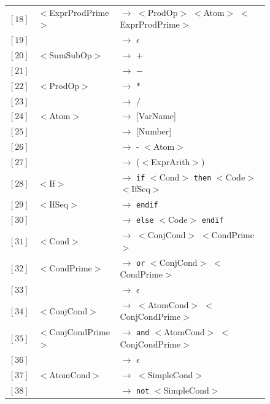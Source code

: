 \documentclass[letterpaper]{article}
\begin{document}
\begin{figure}[H]
\begin{center}
\begin{tabular}{r l l}
                $[18]$ & $<$ExprProdPrime$>$ & $\rightarrow$
                $<$ProdOp$>$ $<$Atom$>$ $<$ExprProdPrime$>$ \\
                $[19]$ & & $\rightarrow$ $\epsilon$ \\

                $[20]$ & $<$SumSubOp$>$ & $\rightarrow$ $+$ \\
                $[21]$ & & $\rightarrow$ $-$ \\
                $[22]$ & $<$ProdOp$>$ & $\rightarrow$ $*$ \\
                $[23]$ & & $\rightarrow$ $/$ \\
                $[24]$ & $<$Atom$>$ & $\rightarrow$ [VarName] \\
                $[25]$ & & $\rightarrow$ [Number] \\
                $[26]$ & & $\rightarrow$ - $<$Atom$>$ \\
                $[27]$ & & $\rightarrow$ ($<$ExprArith$>$) \\

                $[28]$ & $<$If$>$ & $\rightarrow$
                \texttt{if} $<$Cond$>$ \texttt{then} $<$Code$>$ $<$IfSeq$>$ \\
                $[29]$ & $<$IfSeq$>$ & $\rightarrow$
                \texttt{endif} \\
                $[30]$ & & $\rightarrow$
                \texttt{else} $<$Code$>$ \texttt{endif} \\

                $[31]$ & $<$Cond$>$ & $\rightarrow$
                $<$ConjCond$>$ $<$CondPrime$>$ \\
                $[32]$ & $<$CondPrime$>$ & $\rightarrow$
                \texttt{or} $<$ConjCond$>$ $<$CondPrime$>$ \\
                $[33]$ & & $\rightarrow$ $\epsilon$ \\
                $[34]$ & $<$ConjCond$>$ & $\rightarrow$
                $<$AtomCond$>$ $<$ConjCondPrime$>$ \\
                $[35]$ & $<$ConjCondPrime$>$ & $\rightarrow$
                \texttt{and} $<$AtomCond$>$ $<$ConjCondPrime$>$ \\
                $[36]$ & & $\rightarrow$ $\epsilon$ \\
                $[37]$ & $<$AtomCond$>$ & $\rightarrow$ $<$SimpleCond$>$ \\
                $[38]$ & & $\rightarrow$ \texttt{not} $<$SimpleCond$>$ \\


\end{tabular}
\end{center}
\end{figure}
\end{document}
